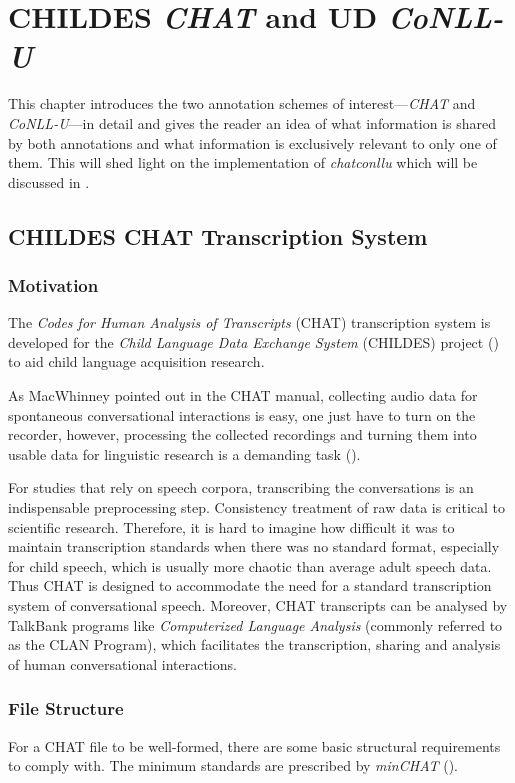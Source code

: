 \chapter{CHILDES \emph{CHAT} and UD \emph{CoNLL-U}}
\label{Chapter2}

This chapter introduces the two annotation schemes of interest---\emph{CHAT} and \emph{CoNLL-U}---in detail and gives the reader an idea of what information is shared by both annotations and what information is exclusively relevant to only one of them. This will shed light on the implementation of \emph{chatconllu} which will be discussed in .

\section{CHILDES CHAT Transcription System}

\subsection{Motivation}
The \emph{Codes for Human Analysis of Transcripts} (CHAT) transcription system is developed for the \emph{Child Language Data Exchange System} (CHILDES) project (\cite{Macwhinney2000}) to aid child language acquisition research.

As MacWhinney pointed out in the CHAT manual, collecting audio data for spontaneous conversational interactions is easy, one just have to turn on the recorder, however, processing the collected recordings and turning them into usable data for linguistic research is a demanding task (\cite{Macwhinney2000}).

For studies that rely on speech corpora, transcribing the conversations is an indispensable preprocessing step. Consistency treatment of raw data is critical to scientific research. Therefore, it is hard to imagine how difficult it was to maintain transcription standards when there was no standard format, especially for child speech, which is usually more chaotic than average adult speech data. Thus CHAT is designed to accommodate the need for a standard transcription system of conversational speech. Moreover, CHAT transcripts can be analysed by TalkBank programs  like \emph{Computerized Language Analysis} (commonly referred to as the CLAN Program), which facilitates the transcription, sharing and analysis of human conversational interactions.

\subsection{File Structure}
For a CHAT file to be well-formed, there are some basic structural requirements to comply with. The minimum standards are prescribed by \emph{minCHAT} (\cite{Macwhinney2000}).

